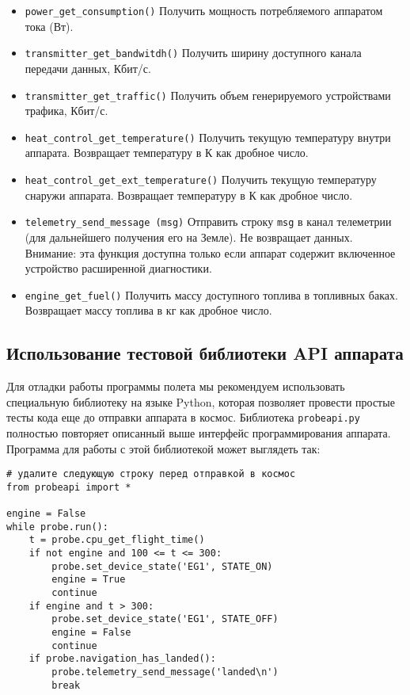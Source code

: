 \documentclass[12pt,a4paper]{article}
\begin{document}
\begin{itemize}
\item \verb'power_get_consumption()' Получить мощность потребляемого аппаратом тока (Вт).

\item \verb'transmitter_get_bandwitdh()' Получить ширину доступного канала передачи
  данных, Кбит/с.
  
\item \verb'transmitter_get_traffic()' Получить объем генерируемого устройствами трафика,
  Кбит/с.

\item \verb'heat_control_get_temperature()' Получить текущую температуру внутри
  аппарата. Возвращает температуру в К как дробное число.
  
\item \verb'heat_control_get_ext_temperature()' Получить текущую температуру снаружи
  аппарата. Возвращает температуру в К как дробное число.

\item \verb'telemetry_send_message (msg)' Отправить строку \verb'msg' в канал телеметрии
  (для дальнейшего получения его на Земле). Не возвращает данных. Внимание: эта функция
  доступна только если аппарат содержит включенное устройство расширенной диагностики.

\item \verb'engine_get_fuel()' Получить массу доступного топлива в топливных
  баках. Возвращает массу топлива в кг как дробное число.

\end{itemize}

\subsection*{Использование тестовой библиотеки API аппарата}

Для отладки работы программы полета мы рекомендуем использовать специальную библиотеку на
языке Python, которая позволяет провести простые тесты кода еще до отправки аппарата в
космос. Библиотека \verb'probeapi.py' полностью повторяет описанный выше интерфейс
программирования аппарата. Программа для работы с этой библиотекой может выглядеть так:

\begin{verbatim}
# удалите следующую строку перед отправкой в космос
from probeapi import *

engine = False
while probe.run():
    t = probe.cpu_get_flight_time()
    if not engine and 100 <= t <= 300:
        probe.set_device_state('EG1', STATE_ON)
        engine = True
        continue
    if engine and t > 300:
        probe.set_device_state('EG1', STATE_OFF)
        engine = False
        continue
    if probe.navigation_has_landed():
        probe.telemetry_send_message('landed\n')
        break
\end{verbatim}
\end{document}
